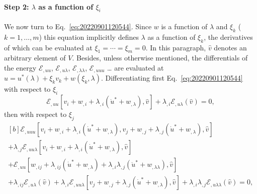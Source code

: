 \documentclass[12pt, final]{scrartcl}
\theoremstyle{definition}
\newcommand{\E}{\mathcal E}
\begin{document}
\paragraph{Step 2: $\lambda$ as a function of $ξ_i$} We now turn to
Eq.~\eqref{eq:20220901120544}. Since $w$ is a function of $\lambda$ and $ξ_k$
($k = 1, \ldots, m$) this equation implicitly defines $\lambda$ as a function of
$ξ_k$, the derivatives of which can be evaluated at $ξ_1 = \cdots = ξ_m =
0$. In this paragraph, $\hat{v}$ denotes an arbitrary element of
$V$. Besides, unless otherwise mentioned, the differentials of the energy
$\E_{,uu}$, $\E_{,u\lambda}$, $\E_{,\lambda\lambda}$, $\E_{,uuu}$ \dots{} are evaluated at
$u = u^\ast(\lambda) + ξ_k v_k + w(ξ_k, \lambda)$. Differentiating first
Eq.~\eqref{eq:20220901120544} with respect to $ξ_i$
\begin{equation}
  \label{eq:20220901121940}
  \E_{,uu}[v_i + w_{,i} + \lambda_{,i} (\dot{u}^\ast + w_{,\lambda}), \hat{v}] + \lambda_{, i} \E_{,u\lambda}(\hat{v}) = 0,
\end{equation}
then with respect to $ξ_j$
\begin{equation}
  \label{eq:20220901125230}
  \begin{gathered}[b]
    \E_{,uuu}[v_i + w_{,i} + \lambda_{,i} (\dot{u}^\ast + w_{,\lambda}), v_j + w_{,j} + \lambda_{,j} (\dot{u}^\ast + w_{,\lambda}), \hat{v}]\\
    + \lambda_{,j}\E_{,uu\lambda}[v_i + w_{,i} + \lambda_{,i} (\dot{u}^\ast + w_{,\lambda}), \hat{v}]\\
    + \E_{,uu}[w_{,ij} + \lambda_{,ij} (\dot{u}^\ast + w_{,\lambda}) + \lambda_{,i}\lambda_{,j} (\ddot{u}^\ast + w_{,\lambda\lambda}), \hat{v}]\\
    + \lambda_{, ij} \E_{,u\lambda}(\hat{v}) + \lambda_{, i} \E_{,uu\lambda}[v_j + w_{,j} + \lambda_{,j} (\dot{u}^\ast + w_{,\lambda}), \hat{v}] + \lambda_{,i} \lambda_{,j} \E_{,u\lambda\lambda}(\hat{v})= 0,
  \end{gathered}
\end{equation}
\end{document}
